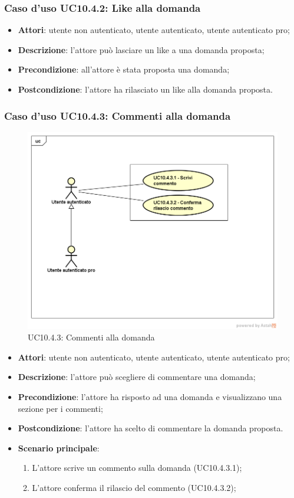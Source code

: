 \subsubsection{Caso d'uso UC10.4.2: Like alla domanda}
	\begin{itemize}
		\item \textbf{Attori}: utente non autenticato, utente autenticato, utente autenticato pro;
		\item \textbf{Descrizione}: l'attore può lasciare un like a una domanda proposta;
		\item \textbf{Precondizione}: all'attore è stata proposta una domanda;
		\item \textbf{Postcondizione}: l'attore ha rilasciato un like alla domanda proposta.
	\end{itemize}
\subsubsection{Caso d'uso UC10.4.3: Commenti alla domanda}
\label{UC10.4.3}
\begin{figure}
	\centering
	\includegraphics[scale=0.5]{UML/UC10_4_3.png}
	\caption{UC10.4.3: Commenti alla domanda}
\end{figure}
	\begin{itemize}
		\item \textbf{Attori}: utente non autenticato, utente autenticato, utente autenticato pro;
		\item \textbf{Descrizione}: l'attore può scegliere di commentare una domanda;
		\item \textbf{Precondizione}: l'attore ha risposto ad una domanda e visualizzano una sezione per i commenti;
		\item \textbf{Postcondizione}: l'attore ha scelto di commentare la domanda proposta.
		\item \textbf{Scenario principale}:
			\begin{enumerate}
				\item L'attore scrive un commento sulla domanda (UC10.4.3.1);
				\item L'attore conferma il rilascio del commento (UC10.4.3.2);
			\end{enumerate}
	\end{itemize}
